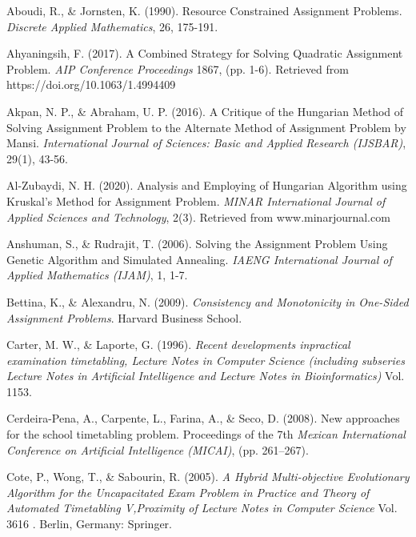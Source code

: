 \documentclass[11pt]{report}
\begin{document}
	\begin{description}
		\item Aboudi, R., \& Jornsten, K. (1990). Resource Constrained Assignment Problems. \emph{Discrete Applied Mathematics}, 26, 175-191.
		
		\item Ahyaningsih, F. (2017). A Combined Strategy for Solving Quadratic Assignment Problem. \emph{AIP
		Conference Proceedings} 1867, (pp. 1-6). Retrieved from https://doi.org/10.1063/1.4994409
		
		\item Akpan, N. P., \& Abraham, U. P. (2016). A Critique of the Hungarian Method of Solving
		Assignment Problem to the Alternate Method of Assignment Problem by Mansi. \emph{International Journal of Sciences: Basic and Applied Research (IJSBAR)}, 29(1), 43-56.
		
		\item Al-Zubaydi, N. H. (2020). Analysis and Employing of Hungarian Algorithm using Kruskal's
		Method for Assignment Problem. \emph{MINAR International Journal of Applied Sciences and
		Technology}, 2(3). Retrieved from www.minarjournal.com
		
		\item Anshuman, S., \& Rudrajit, T. (2006). Solving the Assignment Problem Using Genetic Algorithm
		and Simulated Annealing. \emph{IAENG International Journal of Applied Mathematics (IJAM)}, 1, 1-7.
		
		\item Bettina, K., \& Alexandru, N. (2009). \emph{Consistency and Monotonicity in One-Sided Assignment Problems}. Harvard Business School.
		
		\item Carter, M. W., \& Laporte, G. (1996). \emph{Recent developments inpractical examination timetabling, Lecture Notes in Computer Science (including subseries Lecture Notes in Artificial
		Intelligence and Lecture Notes in Bioinformatics)} Vol. 1153.
		
		\item Cerdeira-Pena, A., Carpente, L., Farina, A., \& Seco, D. (2008). New approaches for the school
		timetabling problem. Proceedings of the 7th \emph{Mexican International Conference on Artificial Intelligence (MICAI)}, (pp. 261–267). 
		
		\item Cote, P., Wong, T., \& Sabourin, R. (2005). \emph{A Hybrid Multi-objective Evolutionary Algorithm for the Uncapacitated Exam Problem in Practice and Theory of Automated Timetabling V,Proximity of Lecture Notes in Computer Science} Vol. 3616 . Berlin, Germany: Springer.
		

\end{description}
\end{document}
